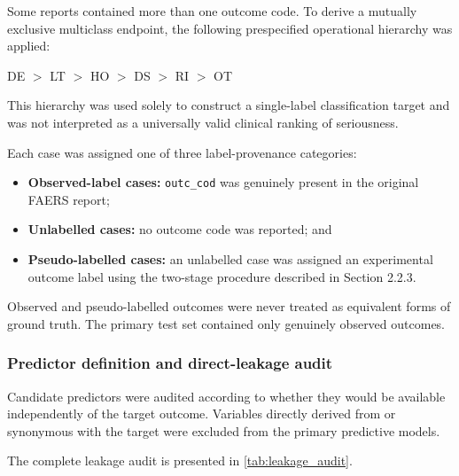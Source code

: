 \documentclass[10pt]{article}
\begin{document}
Some reports contained more than one outcome code. To derive a mutually exclusive multiclass endpoint, the following prespecified operational hierarchy was applied:
\begin{center}
DE $>$ LT $>$ HO $>$ DS $>$ RI $>$ OT
\end{center}
This hierarchy was used solely to construct a single-label classification target and was not interpreted as a universally valid clinical ranking of seriousness.

Each case was assigned one of three label-provenance categories:
\begin{itemize}
\item \textbf{Observed-label cases:} \texttt{outc\_cod} was genuinely present in the original FAERS report;
\item \textbf{Unlabelled cases:} no outcome code was reported; and
\item \textbf{Pseudo-labelled cases:} an unlabelled case was assigned an experimental outcome label using the two-stage procedure described in Section 2.2.3.
\end{itemize}
Observed and pseudo-labelled outcomes were never treated as equivalent forms of ground truth. The primary test set contained only genuinely observed outcomes.

\subsubsection{Predictor definition and direct-leakage audit}
Candidate predictors were audited according to whether they would be available independently of the target outcome. Variables directly derived from or synonymous with the target were excluded from the primary predictive models.

The complete leakage audit is presented in \cref{tab:leakage_audit}.
\end{document}
